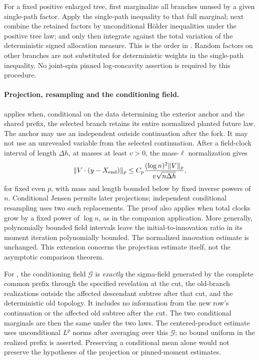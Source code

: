 For a fixed positive enlarged tree, first marginalize all branches
unused by a given single-path factor. Apply the single-path inequality
to that full marginal; next combine the retained factors by
unconditional H\"older inequalities under the positive tree law; and
only then integrate against the total variation of the deterministic
signed allocation measure. This is the order in
. Random factors on
other branches are not substituted for deterministic weights in the
single-path inequality. No joint-spin pinned log-concavity assertion
is required by this procedure.

\paragraph{Projection, resampling and the conditioning field.}
 applies when, conditional on the data determining
the exterior anchor and the shared prefix, the selected branch retains
its entire normalized planted future law. The anchor may use an
independent outside continuation after the fork. It may not use an
unrevealed variable from the selected continuation. After a field-clock
interval of length $\Delta h$, at masses at least $v>0$, the mass-$\ell$
normalization gives
\[
 \|V\cdot(y-X_{\rm end})\|_p
 \le C_p\frac{(\log n)^2\|V\|_p}{v\sqrt{n\Delta h}},
\]
for fixed even $p$, with mass and length bounded below by fixed inverse
powers of $n$. Conditional Jensen permits later projections; independent
conditional resampling uses two such replacements. The proof also applies when total clocks grow by a fixed power of
$\log n$, as in the companion application. More generally, polynomially
bounded field intervals leave the initial-to-innovation ratio in its
moment iteration polynomially bounded. The normalized innovation
estimate is unchanged. This extension concerns the projection estimate
itself, not the asymptotic comparison theorem.

For , the conditioning field $\mathcal G$ is
\emph{exactly} the sigma-field generated by the complete common prefix
through the specified revelation at the cut, the old-branch
realizations outside the affected descendant subtree after that cut,
and the deterministic old topology. It includes no information from
the new row's continuation or the affected old subtree after the cut.
The two conditional marginals are then the same under the two laws.
The centered-product estimate uses unconditional $L^p$ norms after
averaging over this $\mathcal G$; no bound uniform in the realized
prefix is asserted. Preserving a conditional mean alone would not
preserve the hypotheses of the projection or pinned-moment estimates.

